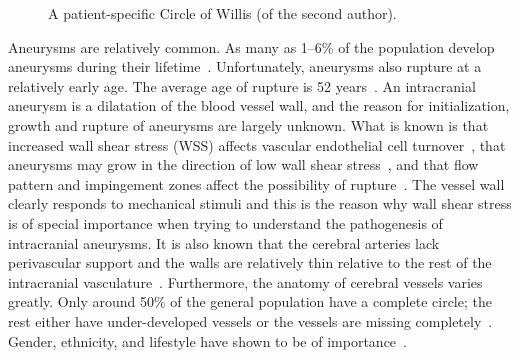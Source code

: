 \begin{figure}
  \begin{center}
  \end{center}
  \caption{A patient-specific Circle of Willis (of the second author).}
  \label{fig:kvs-2:circle_kent}
\end{figure}

Aneurysms are relatively common. As many as 1--6\% of the population
develop aneurysms during their
lifetime~\citep{Weir2002}. Unfortunately, aneurysms also rupture at a
relatively early age. The average age of rupture is 52
years~\citep{Humphrey2001}. An intracranial aneurysm is a dilatation of
the blood vessel wall, and the reason for initialization, growth and
rupture of aneurysms are largely unknown.  What is known is that
increased wall shear stress (WSS) affects vascular endothelial cell
turnover~\citep{DAVIESREMUZZIGORDONEtAl1986}, that aneurysms may grow
in the direction of low wall shear
stress~\citep{BousselRayzMcCullochEtAl2008}, and that flow pattern and
impingement zones affect the possibility of
rupture~\citep{CebralCastroBurgessEtAl2005}. The vessel wall clearly
responds to mechanical stimuli and this is the reason why wall shear
stress is of special importance when trying to understand the
pathogenesis of intracranial aneurysms. It is also known that the
cerebral arteries lack perivascular support and the walls are
relatively thin relative to the rest of the intracranial
vasculature~\citep{Humphrey2001,Stehbens1975}.  Furthermore, the
anatomy of cerebral vessels varies greatly. Only around 50\% of the
general population have a complete circle; the rest either have
under-developed vessels or the vessels are missing
completely~\citep{Fung1984}. Gender, ethnicity, and lifestyle have
shown to be of
importance~\citep{MhurchuAndersonJamrozikEtAl2001,LongstrethNelsonKoepsellEtAl1994,KongableLanzinoGermansonEtAl1996}.

